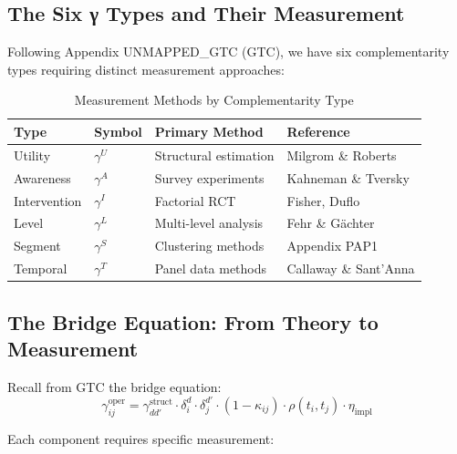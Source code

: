 \subsection{The Six γ Types and Their Measurement}
\label{subsec:six-gamma-measurement}

Following Appendix UNMAPPED_GTC (GTC), we have six complementarity types requiring distinct measurement approaches:

\begin{table}[h]
\centering
\caption{Measurement Methods by Complementarity Type}
\label{tab:gamma-measurement}
\begin{tabular}{llll}
\hline
\textbf{Type} & \textbf{Symbol} & \textbf{Primary Method} & \textbf{Reference} \\
\hline
Utility & $\gamma^U$ & Structural estimation & Milgrom \& Roberts \\
Awareness & $\gamma^A$ & Survey experiments & Kahneman \& Tversky \\
Intervention & $\gamma^I$ & Factorial RCT & Fisher, Duflo \\
Level & $\gamma^L$ & Multi-level analysis & Fehr \& Gächter \\
Segment & $\gamma^S$ & Clustering methods & Appendix PAP1 \\
Temporal & $\gamma^T$ & Panel data methods & Callaway \& Sant'Anna \\
\hline
\end{tabular}
\end{table}

\subsection{The Bridge Equation: From Theory to Measurement}
\label{subsec:bridge-measurement}

Recall from GTC the bridge equation:
\begin{equation}
\gamma^{\text{oper}}_{ij} = \gamma^{\text{struct}}_{dd'} \cdot \delta_i^d \cdot \delta_j^{d'} \cdot (1 - \kappa_{ij}) \cdot \rho(t_i, t_j) \cdot \eta_{\text{impl}}
\end{equation}

Each component requires specific measurement:


